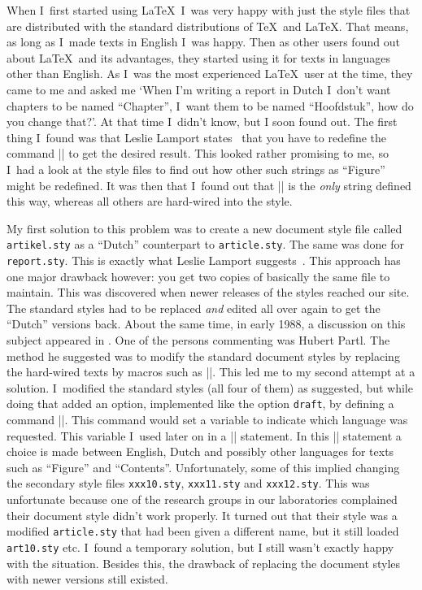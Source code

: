 \documentclass{ltugboat}
\newcommand{\file}[1]{\texttt{#1}}
\begin{document}
When I~first started using \LaTeX\ I~was very happy with just the
style files that are distributed with the standard distributions of
\TeX\ and \LaTeX. That means, as long as I~made texts in English I~was
happy. Then as other users found out about \LaTeX\ and its advantages,
they started using it for texts in languages other than English. As
I~was the most experienced \LaTeX\ user at the time, they came to me
and asked me `When I'm writing a report in Dutch I~don't want chapters
to be named ``Chapter'', I~want them to be named ``Hoofdstuk'', how do
you change that?'. At that time I~didn't know, but I soon found out.
The first thing I~found was that Leslie Lamport states~\cite[pages
85--86]{LLbook} that you have to redefine the command |\@chapapp|
to get the desired result. This looked rather promising to me, so
I~had a look at the style files to find out how other such strings as
``Figure'' might be redefined. It was then that I~found out that
|\@chapapp| is the \emph{only} string defined this way, whereas
all others are hard-wired into the style.

My first solution to this problem was to create a new document style
file called \file{artikel.sty} as a ``Dutch'' counterpart to
\file{article.sty}. The same was done for \file{report.sty}. This is
exactly what Leslie Lamport suggests~\cite{LLth}.  This approach has
one major drawback however: you get two copies of basically the same
file to maintain. This was discovered when newer releases of the
styles reached our site.  The standard styles had to be replaced
\emph{and} edited all over again to get the ``Dutch'' versions back.
About the same time, in early 1988, a discussion on this subject
appeared in \TeXhax. One of the persons commenting was Hubert Partl.
The method he suggested was to modify the standard document styles by
replacing the hard-wired texts by macros such as |\@chapapp|.  This
led me to my second attempt at a solution.  I~modified the standard
styles (all four of them) as suggested, but while doing that added an
option, implemented like the option \texttt{draft}, by defining a
command |\ds@dutch|. This command would set a variable to indicate
which language was requested.  This variable I~used later on in a
|\case| statement. In this |\case| statement a choice is made between
English, Dutch and possibly other languages for texts such as
``Figure'' and ``Contents''.  Unfortunately, some of this implied
changing the secondary style files \file{xxx10.sty}, \file{xxx11.sty}
and \file{xxx12.sty}.  This was unfortunate because one of the
research groups in our laboratories complained their document style
didn't work properly.  It turned out that their style was a modified
\file{article.sty} that had been given a different name, but it still
loaded \file{art10.sty} etc.  I~found a temporary solution, but I
still wasn't exactly happy with the situation. Besides this, the
drawback of replacing the document styles with newer versions still
existed.
\end{document}
